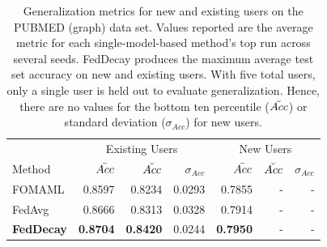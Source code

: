 \begin{table}[h]
    \centering
        \begin{tabular}{|l|rrr|rrr|}
        \hline
            & 
                \multicolumn{3}{c|}{Existing Users} & 
                \multicolumn{3}{c|}{New Users} \\ 
            Method & 
                $\Bar{Acc}$ & $\Breve{Acc}$ & $\sigma_{Acc}$ &
                $\Bar{Acc}$ & $\Breve{Acc}$ & $\sigma_{Acc}$ \\
        \hline
            FOMAML & 
                0.8597 & 0.8234 & 0.0293 & 
                0.7855 & - & - \\
            FedAvg & 
                0.8666 & 0.8313 & 0.0328 & 
                0.7914 & - & - \\
            \textbf{FedDecay} & 
                \textbf{0.8704} & \textbf{0.8420} & 0.0244 & 
                \textbf{0.7950} & - & - \\
        \hline
        \end{tabular}
    \caption{
        Generalization metrics for new and existing users on the PUBMED (graph) data set. Values reported are the average metric for each single-model-based method's top run across several seeds. FedDecay produces the maximum average test set accuracy on new and existing users. With five total users, only a single user is held out to evaluate generalization. Hence, there are no values for the bottom ten percentile ($\Breve{Acc}$) or standard deviation ($\sigma_{Acc}$) for new users.
    }
    \label{tab: metrics--seed--pubmed}
\end{table}
